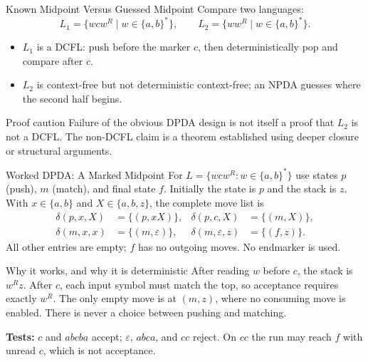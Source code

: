 \documentclass[10pt]{beamer}
\begin{document}
\begin{frame}{Known Midpoint Versus Guessed Midpoint}
  Compare two languages:
  \[
    L_1=\{wcw^R\mid w\in\{a,b\}^*\},
    \qquad
    L_2=\{ww^R\mid w\in\{a,b\}^*\}.
  \]
  \pause
  \begin{itemize}
    \item $L_1$ is a DCFL: push before the marker $c$, then deterministically pop and compare after $c$.
    \item $L_2$ is context-free but not deterministic context-free; an NPDA guesses where the second half begins.
  \end{itemize}
  \pause
  \begin{alertblock}{Proof caution}
    Failure of the obvious DPDA design is not itself a proof that $L_2$ is not a DCFL. The non-DCFL
    claim is a theorem established using deeper closure or structural arguments.
  \end{alertblock}
\end{frame}

\begin{frame}{Worked DPDA: A Marked Midpoint}
  \small
  For $L=\{wcw^R:w\in\{a,b\}^*\}$ use states $p$ (push), $m$ (match),
  and final state $f$. Initially the state is $p$ and the stack is $z$.
  With $x\in\{a,b\}$ and $X\in\{a,b,z\}$, the complete move list is
  \[
    \begin{aligned}
      \delta(p,x,X)&=\{(p,xX)\},&
      \delta(p,c,X)&=\{(m,X)\},\\
      \delta(m,x,x)&=\{(m,\varepsilon)\},&
      \delta(m,\varepsilon,z)&=\{(f,z)\}.
    \end{aligned}
  \]
  All other entries are empty; $f$ has no outgoing moves. No endmarker is used.
  \pause
  \begin{block}{Why it works, and why it is deterministic}
    After reading $w$ before $c$, the stack is $w^Rz$.
    After $c$, each input symbol must match the top, so acceptance requires
    exactly $w^R$. The only empty move is at $(m,z)$, where no consuming
    move is enabled. There is never a choice between pushing and matching.
  \end{block}
  \pause
  \textbf{Tests:} $c$ and $abcba$ accept; $\varepsilon$, $abca$, and $cc$
  reject. On $cc$ the run may reach $f$ with unread $c$, which is not acceptance.
\end{frame}
\end{document}
